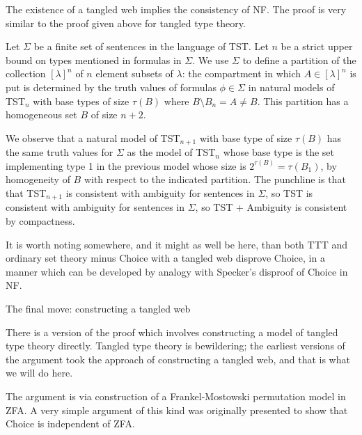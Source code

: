 \documentclass{slides}
\begin{document}
\begin{slide}

The existence of a tangled web implies the consistency of NF.  The proof is very similar to the proof given above for tangled type theory.

Let $\Sigma$ be a finite set of sentences in the language of TST.  Let $n$ be a strict upper bound on types mentioned in formulas in $\Sigma$.  We use $\Sigma$ to define a partition of the collection $[\lambda]^n$ of $n$ element subsets of $\lambda$:  the compartment in which $A \in [\lambda]^n$ is  put is determined by the truth values of formulas $\phi \in \Sigma$ in
natural models of TST$_n$ with base types of size $\tau(B)$ where $B \setminus B_n=A\neq B$.  This partition has a homogeneous set $B$ of size $n+2$.  

\end{slide}
\begin{slide}

We observe
that a natural model of TST$_{n+1}$ with base type of size $\tau(B)$ has the same truth values for $\Sigma$ as the model of TST$_n$ whose base type is the set implementing
type 1 in the previous model whose size is $2^{\tau(B)} = \tau(B_1)$, by homogeneity of $B$ with respect to the indicated partition.  The punchline is that that TST$_{n+1}$
is consistent with ambiguity for sentences in $\Sigma$, so TST is consistent with ambiguity for sentences in $\Sigma$, so TST + Ambiguity is consistent by compactness.

It is worth noting somewhere, and it might as well be here, than both TTT and ordinary set theory minus Choice with a tangled web disprove Choice, in a manner which can be developed by analogy with Specker's disproof of Choice in NF.

\end{slide}

\begin{slide}

{\Large The final move:  constructing a tangled web}

There is a version of the proof which involves constructing a model of tangled type theory directly.  Tangled type theory is bewildering;  the earliest versions of the argument took the approach of constructing a tangled web, and that is what we will do here.

The argument is via construction of a Frankel-Mostowski permutation model in ZFA.  A very simple argument of this kind was originally presented to show that Choice is independent
of ZFA.


\end{slide}
\end{document}
